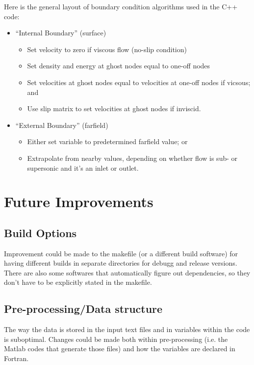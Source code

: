 \documentclass[12pt]{article}
\begin{document}
    Here is the general layout of boundary condition algorithms used in the C++ code:
    \begin{itemize}
        \item ``Internal Boundary'' (surface)
        \begin{itemize}
            \item Set velocity to zero if viscous flow (no-slip condition)
            \item Set density and energy at ghost nodes equal to one-off nodes
            \item Set velocities at ghost nodes equal to velocities at one-off nodes if vicsous; and
            \item Use slip matrix to set velocities at ghost nodes if inviscid.
        \end{itemize}
        \item ``External Boundary'' (farfield)
        \begin{itemize}
            \item Either set variable to predetermined farfield value; or
            \item Extrapolate from nearby values, depending on whether flow is sub- or supersonic and it's an inlet or outlet.
        \end{itemize}
    \end{itemize}
    
    \newpage
    \section{Future Improvements}
    \subsection{Build Options}
    Improvement could be made to the makefile (or a different build software) for having different builds in separate directories for debugg and release versions. There are also some softwares that automatically figure out dependencies, so they don't have to be explicitly stated in the makefile.

    \subsection{Pre-processing/Data structure}
    The way the data is stored in the input text files and in variables within the code is suboptimal. Changes could be made both within pre-processing (i.e. the Matlab codes that generate those files) and how the variables are declared in Fortran.
\end{document}
